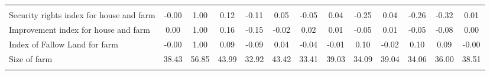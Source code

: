 \begin{tabular}{lcccccccccccc}
{\textbf{Panel E: Security and investment} &  &  &  &  &  &  &  &  &  &  &  & \\
Security rights index for house and farm & -0.00 & 1.00 & 0.12 & -0.11 & 0.05 & -0.05 & 0.04 & -0.25 & 0.04 & -0.26 & -0.32 & 0.01\\
Improvement index for house and farm & 0.00 & 1.00 & 0.16 & -0.15 & -0.02 & 0.02 & 0.01 & -0.05 & 0.01 & -0.05 & -0.08 & 0.00\\
Index of Fallow Land for farm & -0.00 & 1.00 & 0.09 & -0.09 & 0.04 & -0.04 & -0.01 & 0.10 & -0.02 & 0.10 & 0.09 & -0.00\\
Size of farm & 38.43 & 56.85 & 43.99 & 32.92 & 43.42 & 33.41 & 39.03 & 34.09 & 39.04 & 34.06 & 36.00 & 38.51\\
\noalign{\smallskip}\hline\end{tabular}
